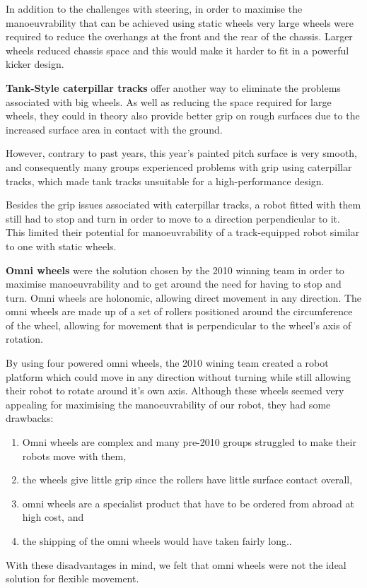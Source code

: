 \documentclass[12pt,a4paper,notitlepage,twocolumn]{report}
\begin{document}
 In addition to the challenges with steering, in order to maximise the
manoeuvrability that can be achieved using static wheels very large
wheels were required to reduce the overhangs at the front and the rear
of the chassis. Larger wheels reduced chassis space and this would
make it harder to fit in a powerful kicker design.\newline

\textbf{Tank-Style caterpillar tracks} offer another way to eliminate
the problems associated with big wheels. As well as reducing the space
required for large wheels, they could in theory also provide better
grip on rough surfaces due to the increased surface area in contact
with the ground.

 However, contrary to past years, this year’s painted pitch
surface is very smooth, and consequently many groups experienced
problems with grip using caterpillar tracks, which made tank tracks
unsuitable for a high-performance design.

Besides the grip issues associated with caterpillar tracks, a robot
fitted with them still had to stop and turn in order to move to a
direction perpendicular to it. This limited their potential for
manoeuvrability of a track-equipped robot similar to one with static
wheels.\newline

\textbf{Omni wheels} were the solution chosen by the 2010 winning team
in order to maximise manoeuvrability and to get around the need for
having to stop and turn. Omni wheels are holonomic, allowing direct
movement in any direction. The omni wheels are made up of a set of
rollers positioned around the circumference of the wheel, allowing for
movement that is perpendicular to the wheel's axis of rotation.

By using four powered omni wheels, the 2010 wining team created a
robot platform which could move in any direction without turning while
still allowing their robot to rotate around it's own axis. Although
these wheels seemed very appealing for maximising the manoeuvrability
of our robot, they had some drawbacks:

\begin{enumerate}
\item Omni wheels are complex and many pre-2010 groups struggled to make their robots move with them,
\item the wheels give little grip since the rollers have little surface contact overall,
\item omni wheels are a specialist product that have to be ordered from abroad at high cost, and
\item the shipping of the omni wheels would have taken fairly long..
\end{enumerate}
With these disadvantages in mind, we felt that omni wheels were not
the ideal solution for flexible movement.
\end{document}
